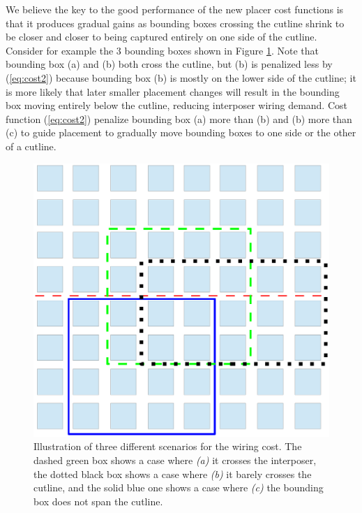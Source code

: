\documentclass{sig-alternate-2013}
\begin{document}
We believe the key to the good performance of the new placer cost functions is that it produces gradual gains as bounding boxes crossing the cutline shrink to be closer and closer to being captured entirely on one side of the cutline. Consider for example the 3 bounding boxes shown in Figure \ref{fig:bb_illustration}. Note that bounding box (a) and (b) both cross the cutline, but (b) is penalized less by (\ref{eq:cost2}) because bounding box (b) is mostly on the lower side of the cutline; it is more likely that later smaller placement changes will result in the bounding box moving entirely below the cutline, reducing interposer wiring demand. Cost function (\ref{eq:cost2}) penalize bounding box (a) more than (b) and (b) more than (c) to guide placement to gradually move bounding boxes to one side or the other of a cutline.

\begin{figure}[!h]
\centering
\includegraphics[width=\linewidth]{bb.eps}
\caption{Illustration of three different scenarios for the wiring cost. The dashed green box shows a case where \textit{(a)} it crosses the interposer, the dotted black box shows a case where \textit{(b)} it barely crosses the cutline, and the solid blue one shows a case where \textit{(c)} the bounding box does not span the cutline.}
\label{fig:bb_illustration}
\end{figure}
\end{document}
